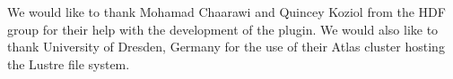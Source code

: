 We would like to thank Mohamad Chaarawi and Quincey Koziol from the HDF group for their help with the development of the plugin. We would also like to thank University of Dresden, Germany for the use of their Atlas cluster hosting the Lustre file system.

